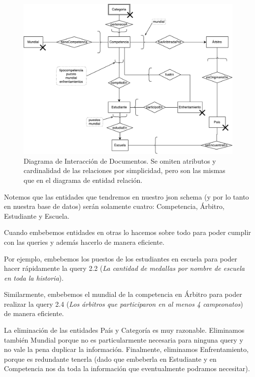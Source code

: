 
\begin{figure}[H]
  \centering
  \includegraphics[width=\textwidth]{img/did.pdf}
  \caption{Diagrama de Interacción de Documentos. Se omiten atributos y cardinalidad de las relaciones por simplicidad, pero son las mismas que en el diagrama de entidad relación.}
\end{figure}

Notemos que las entidades que tendremos en nuestro json schema (y por lo tanto en nuestra base de datos) serán solamente cuatro: Competencia, Árbitro, Estudiante y Escuela.

Cuando embebemos entidades en otras lo hacemos sobre todo para poder cumplir con las queries y además hacerlo de manera eficiente.

Por ejemplo, embebemos los puestos de los estudiantes en escuela para poder hacer rápidamente la query 2.2 (\textit{La cantidad de medallas por nombre de escuela en toda la historia}).

Similarmente, embebemos el mundial de la competencia en Árbitro para poder realizar la query 2.4 (\textit{Los árbitros que participaron en al menos 4 campeonatos}) de manera eficiente.

La eliminación de las entidades País y Categoría es muy razonable. Eliminamos también Mundial porque no es particularmente necesaria para ninguna query y no vale la pena duplicar la información. Finalmente, eliminamos Enfrentamiento, porque es redundante tenerla (dado que embeberla en Estudiante y en Competencia nos da toda la información que eventualmente podramos necesitar).

